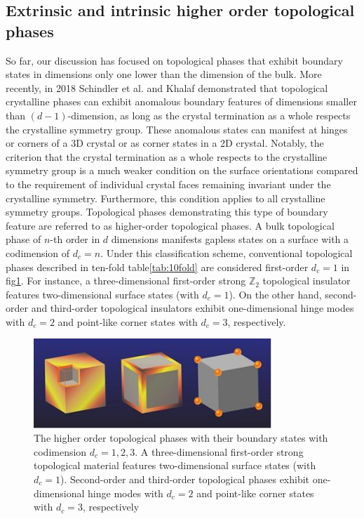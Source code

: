 \subsection{Extrinsic and intrinsic higher order topological phases}
So far, our discussion has focused on topological phases that exhibit boundary states in dimensions only one lower than the dimension of the bulk. More recently, in 2018 Schindler et al.\cite{schindler2018higher} and Khalaf\cite{khalaf2018higher} demonstrated that topological crystalline phases can exhibit anomalous boundary features of dimensions smaller than $(d-1)$-dimension, as long as the crystal termination as a whole respects the crystalline symmetry group. These anomalous states can manifest at hinges or corners of a 3D crystal or as  corner states in a 2D crystal. Notably, the criterion that the crystal termination as a whole respects to the crystalline symmetry group is a much weaker condition on the surface orientations compared to the requirement of individual crystal faces remaining invariant under the crystalline symmetry. Furthermore, this condition applies to all crystalline symmetry groups. Topological phases demonstrating this type of boundary feature are referred to as higher-order topological phases. A bulk topological phase of $n$-th order in $d$ dimensions manifests gapless states on a surface with a codimension of $d_c = n$. Under this classification scheme, conventional topological phases described in ten-fold table\ref{tab:10fold} are considered first-order $d_c=1$ in fig\ref{fig:HOTP}.  For instance, a three-dimensional first-order strong $\mathbb{Z}_2$ topological insulator features two-dimensional surface states (with $d_c = 1$). On the other hand, second-order and third-order topological insulators exhibit one-dimensional hinge modes with $d_c = 2$ and point-like corner states with $d_c = 3$, respectively.

 \begin{figure}[h]
    \centering
    \includegraphics[width =0.8\textwidth]{images/TopologyFigure.jpg}
    \caption{The higher order topological phases with their boundary states with codimension $d_c = 1, 2,3$. A three-dimensional first-order strong topological material features two-dimensional surface states (with $d_c = 1$). Second-order and third-order topological phases exhibit one-dimensional hinge modes with $d_c = 2$ and point-like corner states with $d_c = 3$, respectively }
    \label{fig:HOTP}
\end{figure}

